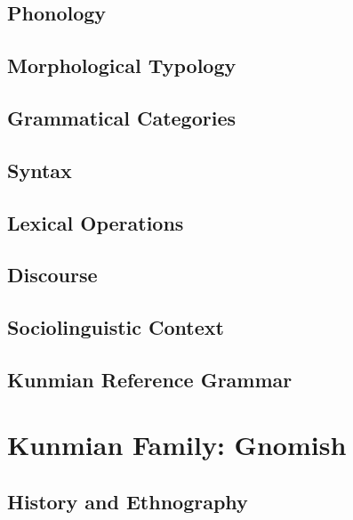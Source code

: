 \documentclass[12pt,letterpaper,openany,twoside]{memoir}
\let\originalpart=\part
\def\part{\cleardoublepage\originalpart}
\begin{document}
\chapter{Phonology}

\chapter{Morphological Typology}

\chapter{Grammatical Categories}

\chapter{Syntax}

\chapter{Lexical Operations}

\chapter{Discourse}

\chapter{Sociolinguistic Context}

\chapter{Kunmian Reference Grammar}

\part{Kunmian Family: Gnomish}

\chapter{History and Ethnography}
\end{document}
